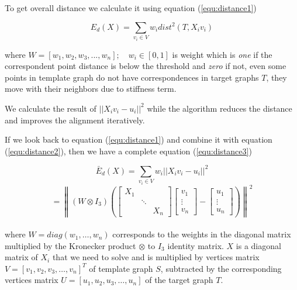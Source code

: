 \documentclass[../structure.tex]{subfiles}
\begin{document}
To get overall distance we calculate it using equation (\ref{equ:distance1})

\begin{equation}
E_{d}(X) = \sum_{v_{i} \in V} w_{i}dist^2(T,X_{i}v_{i})
\label{equ:distance1}
\end{equation}

where $W = [w_{1}, w_{2}, w_{3}, ..., w_{n}];\quad w_{i}\in [0,1]$ is weight which is \textit{one} if the correspondent point distance is below the threshold and \textit{zero} if not, even some points in template graph do not have correspondences in target graphs $T$, they move with their neighbors due to stiffness term. 

We calculate the result of $||X_{i}v_{i}-u_{i}||^2$ while the algorithm reduces the distance and improves the alignment iteratively.

If we look back to equation (\ref{equ:distance1}) and combine it with equation (\ref{equ:distance2}), then we have a complete equation (\ref{equ:distance3})

\begin{equation}
\bar{E}_{d}(X) = \sum_{v_{i}\in V} w_{i}||X_{i}v_{i}-u_{i}||^2
\label{equ:distance3}
\end{equation}
\begin{equation*}
= \left\|(W \otimes I_{3}) \left(
\begin{bmatrix}
X_{1} & & \\
& \ddots & \\
& & X_{n}
\end{bmatrix}
\begin{bmatrix}
v_{1} \\ \vdots \\ v_{n}
\end{bmatrix} -
\begin{bmatrix}
u_{1}\\ \vdots \\ u_{n}
\end{bmatrix}
\right) \right\|^2
\end{equation*}\\

where $W = diag(w_{1},\dots, w_{n})$ corresponds to the weights in the diagonal matrix multiplied by the Kronecker product $\otimes$ to $I_{3}$ identity matrix. $X$ is a diagonal matrix of $X_{i}$ that we need to solve and is multiplied by vertices matrix $V=[v_{1},v_{2},v_{3}, \dots,v_{n}]^T$ of template graph $S$, subtracted by the corresponding vertices matrix $U=[u_{1},u_{2},u_{3}, \dots,u_{n}]$ of the target graph $T$.
\end{document}
